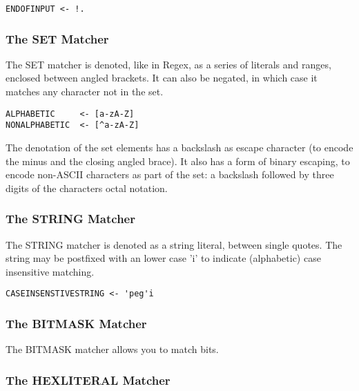 \begin{myquote}
\begin{verbatim}
ENDOFINPUT <- !.
\end{verbatim}
\end{myquote}

\subsubsection{The SET Matcher}

The SET matcher is denoted, like in Regex, as a series of literals
and ranges, enclosed between angled brackets. It can also be negated,
in which case it matches any character not in the set.

\begin{myquote}
\begin{verbatim}
ALPHABETIC     <- [a-zA-Z]
NONALPHABETIC  <- [^a-zA-Z]
\end{verbatim}
\end{myquote}

The denotation of the set elements has a backslash as escape character
(to encode the minus and the closing angled brace).
It also has a form of binary escaping, to encode non-ASCII characters
as part of the set: a backslash followed by three digits of the characters
octal notation.

\subsubsection{The STRING Matcher}

The STRING matcher is denoted as a string literal, between single
quotes. The string may be postfixed with an lower case 'i' to
indicate (alphabetic) case insensitive matching.

\begin{myquote}
\begin{verbatim}
CASEINSENSTIVESTRING <- 'peg'i
\end{verbatim}
\end{myquote}

\subsubsection{The BITMASK Matcher}

The BITMASK matcher allows you to match bits.

\subsubsection{The HEXLITERAL Matcher}

